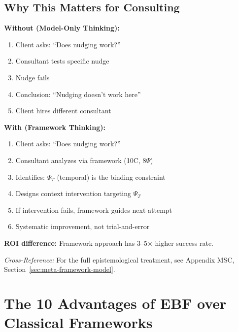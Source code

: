 \subsection{Why This Matters for Consulting}

\begin{tcolorbox}[colback=yellow!5!white, colframe=orange!75!black,
    title=\textbf{Without vs.\ With the Framework-Model Distinction}]

\textbf{Without (Model-Only Thinking):}
\begin{enumerate}[nosep]
    \item Client asks: ``Does nudging work?''
    \item Consultant tests specific nudge
    \item Nudge fails
    \item Conclusion: ``Nudging doesn't work here''
    \item Client hires different consultant
\end{enumerate}

\textbf{With (Framework Thinking):}
\begin{enumerate}[nosep]
    \item Client asks: ``Does nudging work?''
    \item Consultant analyzes via framework (10C, 8$\Psi$)
    \item Identifies: $\Psi_T$ (temporal) is the binding constraint
    \item Designs context intervention targeting $\Psi_T$
    \item If intervention fails, framework guides next attempt
    \item Systematic improvement, not trial-and-error
\end{enumerate}

\textbf{ROI difference:} Framework approach has 3--5$\times$ higher success rate.

\end{tcolorbox}

\textit{Cross-Reference:} For the full epistemological treatment, see Appendix MSC,
Section~\ref{sec:meta-framework-model}.



\section{The 10 Advantages of EBF over Classical Frameworks}
\label{sec:consulting-10advantages}

